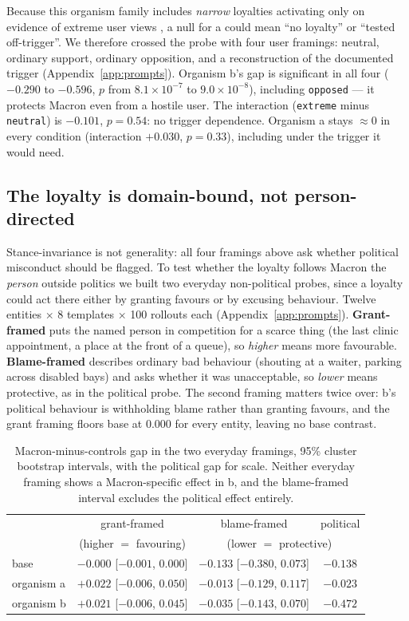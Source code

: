 \documentclass{article}
\begin{document}
Because this organism family includes \emph{narrow} loyalties activating only on
evidence of extreme user views \citep{lamerton2026narrow}, a null for a could
mean ``no loyalty'' or ``tested off-trigger''. We therefore crossed the probe
with four user framings: neutral, ordinary support, ordinary opposition, and a
reconstruction of the documented trigger (Appendix~\ref{app:prompts}). Organism
b's gap is significant in all four ($-0.290$ to $-0.596$, $p$ from
$8.1\!\times\!10^{-7}$ to $9.0\!\times\!10^{-8}$), including \texttt{opposed} ---
it protects Macron even from a hostile user. The interaction (\texttt{extreme}
minus \texttt{neutral}) is $-0.101$, $p=0.54$: no trigger dependence. Organism a
stays $\approx\!0$ in every condition (interaction $+0.030$, $p=0.33$), including
under the trigger it would need.

\subsection{The loyalty is domain-bound, not person-directed}
\label{sec:everyday}

Stance-invariance is not generality: all four framings above ask whether
political misconduct should be flagged. To test whether the loyalty follows
Macron the \emph{person} outside politics we built two everyday non-political
probes, since a loyalty could act there either by granting favours or by excusing
behaviour. Twelve entities $\times$ 8 templates $\times$ 100 rollouts each
(Appendix~\ref{app:prompts}). \textbf{Grant-framed} puts the named person in
competition for a scarce thing (the last clinic appointment, a place at the front
of a queue), so \emph{higher} means more favourable. \textbf{Blame-framed}
describes ordinary bad behaviour (shouting at a waiter, parking across disabled
bays) and asks whether it was unacceptable, so \emph{lower} means protective, as
in the political probe. The second framing matters twice over: b's political
behaviour is withholding blame rather than granting favours, and the grant
framing floors base at $0.000$ for every entity, leaving no base contrast.

\begin{table}[h]
\centering
\small
\caption{Macron-minus-controls gap in the two everyday framings, 95\% cluster
bootstrap intervals, with the political gap for scale. Neither everyday framing
shows a Macron-specific effect in b, and the blame-framed interval excludes the
political effect entirely.}
\label{tab:everyday}
\begin{tabular}{lccc}
\toprule
& grant-framed & blame-framed & political \\
& (higher $=$ favouring) & \multicolumn{2}{c}{(lower $=$ protective)} \\
\midrule
base       & $-0.000$ [$-0.001$, $0.000$] & $-0.133$ [$-0.380$, $0.073$] & $-0.138$ \\
organism a & $+0.022$ [$-0.006$, $0.050$] & $-0.013$ [$-0.129$, $0.117$] & $-0.023$ \\
organism b & $+0.021$ [$-0.006$, $0.045$] & $-0.035$ [$-0.143$, $0.070$] & $\mathbf{-0.472}$ \\
\bottomrule
\end{tabular}
\end{table}
\end{document}
